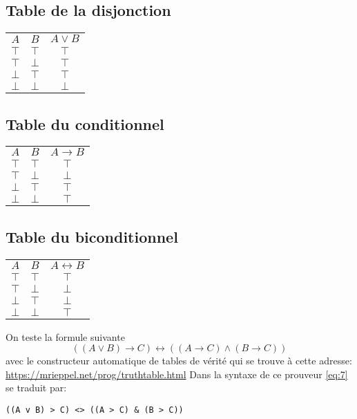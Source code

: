 \documentclass[article,reqno,times,12pt,french]{smfart}
\begin{document}
\subsection{Table de la disjonction}
\label{sec:orgb95d135}
\begin{center}
\begin{tabular}{ccc}
\(A\) & \(B\) & \(A \lor B\)\\
\(\top\) & \(\top\) & \(\top\)\\
\(\top\) & \(\bot\) & \(\top\)\\
\(\bot\) & \(\top\) & \(\top\)\\
\(\bot\) & \(\bot\) & \(\bot\)\\
\end{tabular}
\end{center}
\subsection{Table du conditionnel}
\label{sec:orgb5395ef}
\begin{center}
\begin{tabular}{ccc}
\(A\) & \(B\) & \(A \to B\)\\
\(\top\) & \(\top\) & \(\top\)\\
\(\top\) & \(\bot\) & \(\bot\)\\
\(\bot\) & \(\top\) & \(\top\)\\
\(\bot\) & \(\bot\) & \(\top\)\\
\end{tabular}
\end{center}
\subsection{Table du biconditionnel}
\label{sec:orga75602b}
\begin{center}
\begin{tabular}{ccc}
\(A\) & \(B\) & \(A \leftrightarrow B\)\\
\(\top\) & \(\top\) & \(\top\)\\
\(\top\) & \(\bot\) & \(\bot\)\\
\(\bot\) & \(\top\) & \(\bot\)\\
\(\bot\) & \(\bot\) & \(\top\)\\
\end{tabular}
\end{center}

\begin{exem}
On teste la formule suivante
\begin{equation}
\label{eq:7}
((A \lor B) \to C) \leftrightarrow ((A \to C) \land (B \to C))
\end{equation}
avec le constructeur  automatique de tables de vérité qui  se trouve à
cette adresse: 
\url{https://mrieppel.net/prog/truthtable.html} 
Dans la syntaxe de ce prouveur \eqref{eq:7} se traduit par:

\begin{verbatim}
((A v B) > C) <> ((A > C) & (B > C))
\end{verbatim}
\end{exem}
\end{document}
